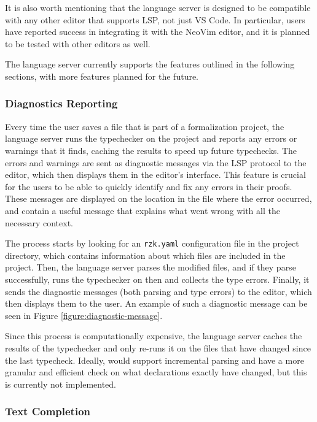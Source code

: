 It is also worth mentioning that the language server is designed to be compatible
with any other editor that supports LSP, not just VS Code.
In particular, users have reported success in integrating it with the NeoVim editor,
and it is planned to be tested with other editors as well.

The language server currently supports the features outlined in the following sections, with more features planned for the future.

\subsubsection{Diagnostics Reporting}

Every time the user saves a file that is part of a formalization project, the language server runs the typechecker
on the project and reports any errors or warnings that it finds, caching the results to speed up future typechecks.
The errors and warnings are sent as diagnostic messages via the LSP protocol to the editor,
which then displays them in the editor's interface.
This feature is crucial for the users to be able to quickly identify and fix any errors in their proofs.
These messages are displayed on the location in the file where the error occurred,
and contain a useful message that explains what went wrong with all the necessary context.

The process starts by looking for an \texttt{rzk.yaml} configuration file in the project directory,
which contains information about which files are included in the project.
Then, the language server parses the modified files, and if they parse successfully,
runs the typechecker on then and collects the type errors.
Finally, it sends the diagnostic messages (both parsing and type errors) to the editor,
which then displays them to the user.
An example of such a diagnostic message can be seen in Figure \ref{figure:diagnostic-message}.

Since this process is computationally expensive, the language server caches the results of the typechecker
and only re-runs it on the files that have changed since the last typecheck.
Ideally, \Rzk{} would support incremental parsing and have a more granular and efficient check
on what declarations exactly have changed, but this is currently not implemented.

\subsubsection{Text Completion}

